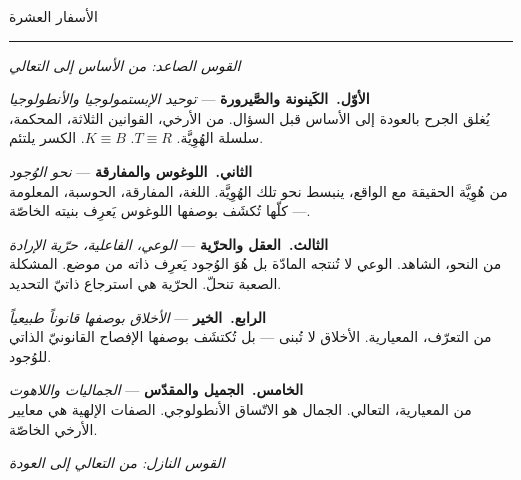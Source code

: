 \documentclass[10pt, openany, oneside]{book}
\renewcommand{\large}{\fontsize{11.5}{14}\selectfont}
\newcommand{\separator}{%
    \begin{center}
        \rule{0.3\textwidth}{0.3pt}
    \end{center}
}
\begin{document}
\vspace{1.5em}

\begin{center}
    {\large الأسفار العشرة}
\end{center}
\separator

\vspace{0.3em}

\begin{center}
    \itshape القوس الصاعد: من الأساس إلى التعالي
\end{center}

\vspace{0.5em}

\noindent \textbf{الأوّل.\ الكَينونة والصَّيرورة} --- \textit{توحيد الإبستمولوجيا والأنطولوجيا}\\
يُغلق الجرح بالعودة إلى الأساس قبل السؤال. من الأرخي، القوانين الثلاثة، المحكمة، سلسلة الهُوِيَّة. $T \equiv R$. $K \equiv B$. الكسر يلتئم.

\vspace{0.5em}

\noindent \textbf{الثاني.\ اللوغوس والمفارقة} --- \textit{نحو الوُجود}\\
من هُوِيَّة الحقيقة مع الواقع، ينبسط نحو تلك الهُوِيَّة. اللغة، المفارقة، الحوسبة، المعلومة --- كلّها تُكشَف بوصفها اللوغوس يَعرِف بنيته الخاصّة.

\vspace{0.5em}

\noindent \textbf{الثالث.\ العقل والحرّية} --- \textit{الوعي، الفاعلية، حرّية الإرادة}\\
من النحو، الشاهد. الوعي لا تُنتجه المادّة بل هُوَ الوُجود يَعرِف ذاته من موضع. المشكلة الصعبة تنحلّ. الحرّية هي استرجاع ذاتيّ التحديد.

\vspace{0.5em}

\noindent \textbf{الرابع.\ الخير} --- \textit{الأخلاق بوصفها قانوناً طبيعياً}\\
من التعرّف، المعيارية. الأخلاق لا تُبنى --- بل تُكتشَف بوصفها الإفصاح القانونيّ الذاتي للوُجود.

\vspace{0.5em}

\noindent \textbf{الخامس.\ الجميل والمقدّس} --- \textit{الجماليات واللاهوت}\\
من المعيارية، التعالي. الجمال هو الاتّساق الأنطولوجي. الصفات الإلهية هي معايير الأرخي الخاصّة.

\vspace{1.5em}

\begin{center}
    \itshape القوس النازل: من التعالي إلى العودة
\end{center}
\end{document}
